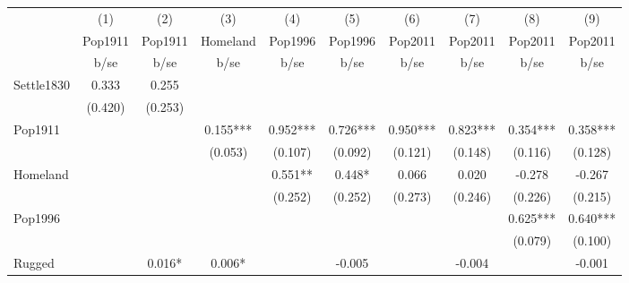 {
\def\sym#1{\ifmmode^{#1}\else\(^{#1}\)\fi}
\begin{tabular}{l*{9}{c}}
\hline\hline
                    &\multicolumn{1}{c}{(1)}&\multicolumn{1}{c}{(2)}&\multicolumn{1}{c}{(3)}&\multicolumn{1}{c}{(4)}&\multicolumn{1}{c}{(5)}&\multicolumn{1}{c}{(6)}&\multicolumn{1}{c}{(7)}&\multicolumn{1}{c}{(8)}&\multicolumn{1}{c}{(9)}\\
                    &\multicolumn{1}{c}{Pop1911}&\multicolumn{1}{c}{Pop1911}&\multicolumn{1}{c}{Homeland}&\multicolumn{1}{c}{Pop1996}&\multicolumn{1}{c}{Pop1996}&\multicolumn{1}{c}{Pop2011}&\multicolumn{1}{c}{Pop2011}&\multicolumn{1}{c}{Pop2011}&\multicolumn{1}{c}{Pop2011}\\
                    &        b/se   &        b/se   &        b/se   &        b/se   &        b/se   &        b/se   &        b/se   &        b/se   &        b/se   \\
\hline
Settle1830          &       0.333   &       0.255   &               &               &               &               &               &               &               \\
                    &     (0.420)   &     (0.253)   &               &               &               &               &               &               &               \\
Pop1911             &               &               &       0.155***&       0.952***&       0.726***&       0.950***&       0.823***&       0.354***&       0.358***\\
                    &               &               &     (0.053)   &     (0.107)   &     (0.092)   &     (0.121)   &     (0.148)   &     (0.116)   &     (0.128)   \\
Homeland            &               &               &               &       0.551** &       0.448*  &       0.066   &       0.020   &      -0.278   &      -0.267   \\
                    &               &               &               &     (0.252)   &     (0.252)   &     (0.273)   &     (0.246)   &     (0.226)   &     (0.215)   \\
Pop1996             &               &               &               &               &               &               &               &       0.625***&       0.640***\\
                    &               &               &               &               &               &               &               &     (0.079)   &     (0.100)   \\
Rugged              &               &       0.016*  &       0.006*  &               &      -0.005   &               &      -0.004   &               &      -0.001   \\

\end{tabular}}
